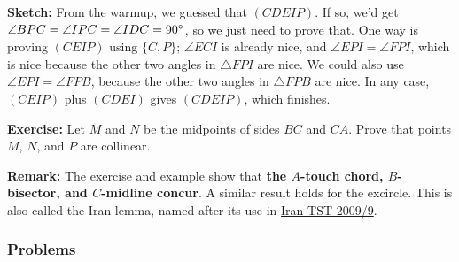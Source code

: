 \documentclass[11pt,paper=letter]{scrartcl}
\begin{document}
\begin{enumerate}
\textbf{Sketch:} From the warmup, we guessed that $(CDEIP)$. If so, we'd get $\angle BPC = \angle IPC = \angle IDC = 90^\circ$, so we just need to prove that. One way is proving $(CEIP)$ using $\{C, P\}$; $\angle ECI$ is already nice, and $\angle EPI = \angle FPI$, which is nice because the other two angles in $\triangle FPI$ are nice. We could also use $\angle EPI = \angle FPB$, because the other two angles in $\triangle FPB$ are nice. In any case, $(CEIP)$ plus $(CDEI)$ gives $(CDEIP)$, which finishes.

\textbf{Exercise:} Let $M$ and $N$ be the midpoints of sides $BC$ and $CA$. Prove that points $M$, $N$, and $P$ are collinear.

\textbf{Remark:} The exercise and example show that \textbf{the $A$-touch chord, $B$-bisector, and $C$-midline concur}. A similar result holds for the excircle. This is also called the Iran lemma, named after its use in \href{https://artofproblemsolving.com/community/c6h277108p1499412}{Iran TST 2009/9}.

\end{enumerate}

\subsubsection*{Problems}
\end{document}

